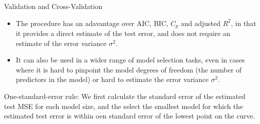\documentclass[11pt, a4paper]{article}
\begin{document}
Validation and Cross-Validation
\begin{itemize}
  \item The procedure has an adavantage over AIC, BIC, $C_p$ and adjusted $R^2$, in that it provides a direct estimate of the test error, and does not require an estimate of the error variance $\sigma^2$. 
  \item It can also be used in a wider range of model selection tasks, even in cases where it is hard to pinpoint the model degrees of freedom (the number of predictors in the model) or hard to estimate the error variance $\sigma^2$.
\end{itemize}
One-standard-error rule: We first calculate the standard error of the estimated test MSE for each model size, and the select the smallest model for which the estimated test error is within oen standard error of the lowest point on the curve.\\[1mm]
\end{document}
